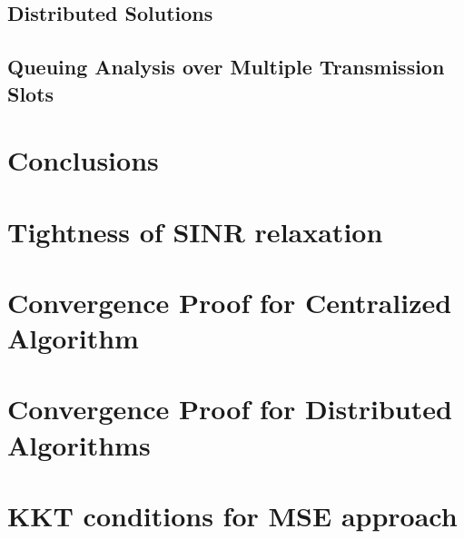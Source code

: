 \documentclass[10pt,journal,twocolumn,letterpaper]{./../Styles/IEEEtran}
\begin{document}
\subsection{Distributed Solutions} \label{sec-5.2}


\subsection{Queuing Analysis over Multiple Transmission Slots} \label{time-correlated}
\review{}

\section{Conclusions} \label{sec-6}





\clearpage

\appendices

%

\section{Tightness of \ac{SINR} relaxation} \label{a-3}
\review{}

\section{Convergence Proof for Centralized Algorithm} \label{sec-3.5}
\review{}

\section{Convergence Proof for Distributed Algorithms} \label{sec-dist-conv}
\review{}

\section{\ac{KKT} conditions for \ac{MSE} approach} \label{a-1}

\end{document}

